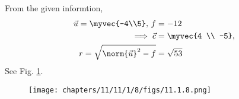 From the given informtion,
\begin{align}
 \vec{u}=\myvec{-4\\5},\,
 f&=-12\\
\implies \vec{c}&=\myvec{4 \\ -5},\\
	r=\sqrt{\norm{\vec{u}}^2-f}
&=\sqrt{53}
\end{align}
See Fig. 
\ref{fig:chapters/11/11/1/8/Fig1}.
\begin{figure}[H]
	\begin{center} 
	   \texttt{[image: chapters/11/11/1/8/figs/11.1.8.png]}
	\end{center}
\caption{}
\label{fig:chapters/11/11/1/8/Fig1}
\end{figure}
